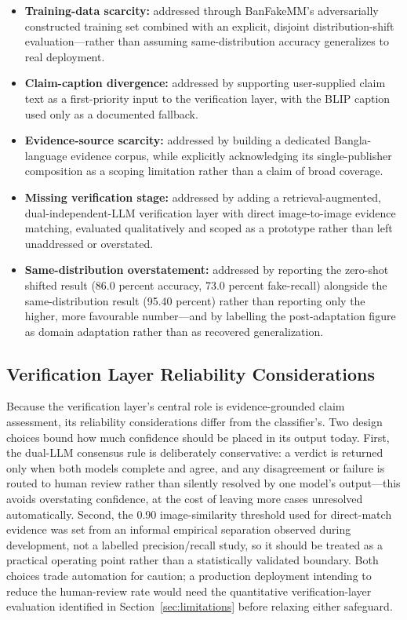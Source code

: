 \documentclass[conference,a4paper]{IEEEtran}
\begin{document}
\begin{itemize}
\item \textbf{Training-data scarcity:} addressed through BanFakeMM's
adversarially constructed training set combined with an explicit, disjoint
distribution-shift evaluation---rather than assuming same-distribution
accuracy generalizes to real deployment.

\item \textbf{Claim-caption divergence:} addressed by supporting
user-supplied claim text as a first-priority input to the verification layer,
with the BLIP caption used only as a documented fallback.

\item \textbf{Evidence-source scarcity:} addressed by building a dedicated
Bangla-language evidence corpus, while explicitly acknowledging its
single-publisher composition as a scoping limitation rather than a claim of
broad coverage.

\item \textbf{Missing verification stage:} addressed by adding a
retrieval-augmented, dual-independent-LLM verification layer with direct
image-to-image evidence matching, evaluated qualitatively and scoped as a
prototype rather than left unaddressed or overstated.

\item \textbf{Same-distribution overstatement:} addressed by reporting the
zero-shot shifted result (86.0 percent accuracy, 73.0 percent fake-recall)
alongside the same-distribution result (95.40 percent) rather than reporting
only the higher, more favourable number---and by labelling the post-adaptation
figure as domain adaptation rather than as recovered generalization.
\end{itemize}

\subsection{Verification Layer Reliability Considerations}

Because the verification layer's central role is evidence-grounded claim
assessment, its reliability considerations differ from the classifier's. Two
design choices bound how much confidence should be placed in its output today.
First, the dual-LLM consensus rule is deliberately conservative: a verdict is
returned only when both models complete and agree, and any disagreement or
failure is routed to human review rather than silently resolved by one model's
output---this avoids overstating confidence, at the cost of leaving more cases
unresolved automatically. Second, the 0.90 image-similarity threshold used for
direct-match evidence was set from an informal empirical separation observed
during development, not a labelled precision/recall study, so it should be
treated as a practical operating point rather than a statistically validated
boundary. Both choices trade automation for caution; a production deployment
intending to reduce the human-review rate would need the quantitative
verification-layer evaluation identified in Section~\ref{sec:limitations}
before relaxing either safeguard.
\end{document}
